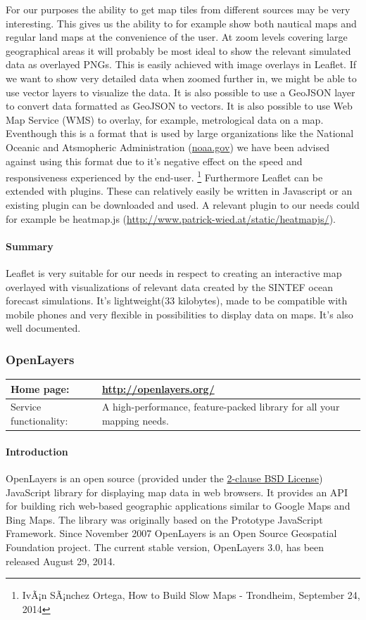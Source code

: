 \documentclass[11pt,a4paper,titlepage,oneside]{report}
\begin{document}
    For our purposes the ability to get map tiles from different sources may be very interesting. This gives us the ability to for example show both nautical maps and regular land maps at the convenience of the user. At zoom levels covering large geographical areas it will probably be most ideal to show the relevant simulated data as overlayed PNGs. This is easily achieved with image overlays in Leaflet. If we want to show very detailed data when zoomed further in, we might be able to use vector layers to visualize the data. It is also possible to use a GeoJSON layer to convert data formatted as GeoJSON to vectors.
    It is also possible to use Web Map Service (WMS) to overlay, for example, metrological data on a map. Eventhough this is a format that is used by large organizations like the National Oceanic and Atsmopheric Administration (\url{noaa.gov}) we have been advised against using this format due to it's negative effect on the speed and responsiveness experienced by the end-user. \footnote{IvÃ¡n SÃ¡nchez Ortega, How to Build Slow Maps - Trondheim, September 24, 2014}
    Furthermore Leaflet can be extended with plugins. These can relatively easily be written in Javascript or an existing plugin can be downloaded and used. A relevant plugin to our needs could for example be heatmap.js (\url{http://www.patrick-wied.at/static/heatmapjs/}).

    \paragraph{Summary}
    Leaflet is very suitable for our needs in respect to creating an interactive map overlayed with visualizations of relevant data created by the SINTEF ocean forecast simulations. It's lightweight(33 kilobytes), made to be compatible with mobile phones and very flexible in possibilities to display data on maps. It's also well documented.

  \subsubsection{OpenLayers}
   \begin{tabular}{|p{4cm}|p{8cm}|}
     \hline
     Home page: & \url{http://openlayers.org/} \\
     \hline
     Service functionality: & A high-performance, feature-packed library for all your mapping needs. \\
     \hline
   \end{tabular}
   \paragraph{Introduction} \indent
   OpenLayers is an open source (provided under the \href{'https://tldrlegal.com/license/bsd-2-clause-license-(freebsd)'}{2-clause BSD License}) JavaScript library for displaying map data in web browsers. It provides an API for building rich web-based geographic applications similar to Google Maps and Bing Maps. The library was originally based on the Prototype JavaScript Framework. Since November 2007 OpenLayers is an Open Source Geospatial Foundation project.
   The current stable version, OpenLayers 3.0, has been released August 29, 2014.
\end{document}
